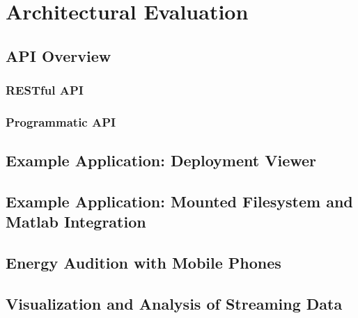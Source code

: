 
\chapter{Architectural Evaluation}
\label{chap:archeval}

\section{API Overview}
	\subsection{RESTful API}
	\subsection{Programmatic API}
\section{Example Application: Deployment Viewer}
\section{Example Application: Mounted Filesystem and Matlab Integration}


\section{Energy Audition with Mobile Phones}









\section{Visualization and Analysis of Streaming Data}

